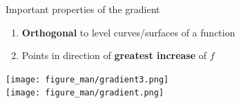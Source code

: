 \documentclass[11pt,compress,t,notes=noshow, xcolor=table]{beamer}
\begin{document}
\begin{vbframe}{Important properties of the gradient}

\begin{enumerate}
	\item \textbf{Orthogonal} to level curves/surfaces of a function\,\\
	\item Points in direction of \textbf{greatest increase} of $f$\end{enumerate}
	\begin{center}
		\texttt{[image: figure\_man/gradient3.png]} \\\texttt{[image: figure\_man/gradient.png]}



\end{center}
\end{vbframe}
\end{document}
